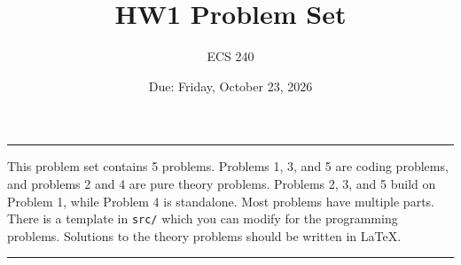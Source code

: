 \documentclass{article}
\begin{document}
\title{HW1 Problem Set}
\author{ECS 240}
\date{Due: Friday, October 23, 2026}

\maketitle

\hrule

\bigskip

\noindent
This problem set contains 5 problems.
Problems 1, 3, and 5 are coding problems,
and problems 2 and 4 are pure theory problems.
Problems 2, 3, and 5 build on Problem 1,
while Problem 4 is standalone.
Most problems have multiple parts.
There is a template in \texttt{src/} which you can modify for the programming problems.
Solutions to the theory problems should be written in LaTeX.

\bigskip

\hrule

\bigskip
\end{document}
